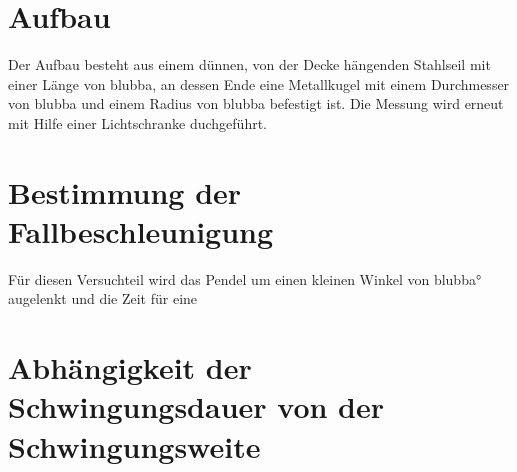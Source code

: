 \section{Aufbau}

Der Aufbau besteht aus einem dünnen, von der Decke hängenden Stahlseil mit einer Länge von blubba, an dessen Ende eine Metallkugel mit einem Durchmesser von blubba und einem Radius von blubba befestigt ist. Die Messung wird erneut mit Hilfe einer Lichtschranke duchgeführt.

\section{Bestimmung der Fallbeschleunigung}

Für diesen Versuchteil wird das Pendel um einen kleinen Winkel von blubba° augelenkt und die Zeit für eine 

\section{Abhängigkeit der Schwingungsdauer von der Schwingungsweite}